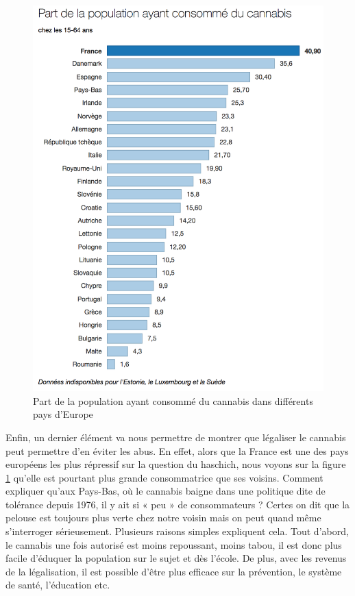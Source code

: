 \begin{figure}\centering
	\includegraphics[height=.4\textheight]{images/grapheconsoPop.png}
    \caption{Part de la population ayant consommé du cannabis dans différents pays d'Europe}
    \label{fig:grapheconsopop}
\end{figure}

Enfin, un dernier élément va nous permettre de montrer que légaliser le cannabis peut permettre d’en éviter les abus. En effet, alors que la France est une des pays européens les plus répressif sur la question du haschich, nous voyons sur la figure \ref{fig:grapheconsopop} qu’elle est pourtant plus grande consommatrice que ses voisins. Comment expliquer qu’aux Pays-Bas, où le cannabis baigne dans une politique dite de tolérance depuis 1976, il y ait si « peu » de consommateurs ? Certes on dit que la pelouse est toujours plus verte chez notre voisin mais on peut quand même s'interroger sérieusement. Plusieurs raisons simples expliquent cela. Tout d’abord, le cannabis une fois autorisé est moins repoussant, moins tabou, il est donc plus facile d’éduquer la population sur le sujet et dès l’école. De plus, avec les revenus de la légalisation, il est possible d’être plus efficace sur la prévention, le système de santé, l’éducation etc. \cite{drugreport}

